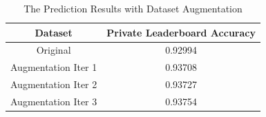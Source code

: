 \documentclass[10pt,journal,compsoc]{IEEEtran}
\begin{document}
\begin{table}[!b]
  \centering
  \caption{The Prediction Results with Dataset Augmentation} 
  \label{tab:ridge_aug}
  \begin{tabular}{c|c}
  \toprule
  Dataset & Private Leaderboard Accuracy\\
  \midrule
  Original & 0.92994 \\
  Augmentation Iter 1 & 0.93708 \\
  Augmentation Iter 2 & 0.93727 \\
  Augmentation Iter 3 & 0.93754 \\
  \bottomrule
  \end{tabular}
\end{table}

\begin{figure}[!t]
  \centering
\end{figure}
\end{document}
